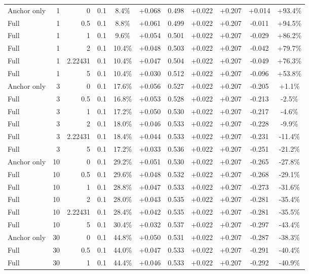 \begin{table}[htbp]
\begin{tabular}{lrrrccccccc}
Anchor only & 1 & 0 & 0.1 & 8.4\% & +0.068 & 0.498 & +0.022 & +0.207 & +0.014 & +93.4\% \\
Full & 1 & 0.5 & 0.1 & 8.8\% & +0.061 & 0.499 & +0.022 & +0.207 & -0.011 & +94.5\% \\
Full & 1 & 1 & 0.1 & 9.6\% & +0.054 & 0.501 & +0.022 & +0.207 & -0.029 & +86.2\% \\
Full & 1 & 2 & 0.1 & 10.4\% & +0.048 & 0.503 & +0.022 & +0.207 & -0.042 & +79.7\% \\
Full & 1 & 2.22431 & 0.1 & 10.4\% & +0.047 & 0.504 & +0.022 & +0.207 & -0.049 & +76.3\% \\
Full & 1 & 5 & 0.1 & 10.4\% & +0.030 & 0.512 & +0.022 & +0.207 & -0.096 & +53.8\% \\
Anchor only & 3 & 0 & 0.1 & 17.6\% & +0.056 & 0.527 & +0.022 & +0.207 & -0.205 & +1.1\% \\
Full & 3 & 0.5 & 0.1 & 16.8\% & +0.053 & 0.528 & +0.022 & +0.207 & -0.213 & -2.5\% \\
Full & 3 & 1 & 0.1 & 17.2\% & +0.050 & 0.530 & +0.022 & +0.207 & -0.217 & -4.6\% \\
Full & 3 & 2 & 0.1 & 18.0\% & +0.046 & 0.533 & +0.022 & +0.207 & -0.228 & -9.9\% \\
Full & 3 & 2.22431 & 0.1 & 18.4\% & +0.044 & 0.533 & +0.022 & +0.207 & -0.231 & -11.4\% \\
Full & 3 & 5 & 0.1 & 17.2\% & +0.033 & 0.536 & +0.022 & +0.207 & -0.251 & -21.2\% \\
Anchor only & 10 & 0 & 0.1 & 29.2\% & +0.051 & 0.530 & +0.022 & +0.207 & -0.265 & -27.8\% \\
Full & 10 & 0.5 & 0.1 & 29.6\% & +0.048 & 0.532 & +0.022 & +0.207 & -0.268 & -29.1\% \\
Full & 10 & 1 & 0.1 & 28.8\% & +0.047 & 0.533 & +0.022 & +0.207 & -0.273 & -31.6\% \\
Full & 10 & 2 & 0.1 & 28.0\% & +0.043 & 0.535 & +0.022 & +0.207 & -0.281 & -35.4\% \\
Full & 10 & 2.22431 & 0.1 & 28.4\% & +0.042 & 0.535 & +0.022 & +0.207 & -0.281 & -35.5\% \\
Full & 10 & 5 & 0.1 & 30.4\% & +0.032 & 0.537 & +0.022 & +0.207 & -0.297 & -43.4\% \\
Anchor only & 30 & 0 & 0.1 & 44.8\% & +0.050 & 0.531 & +0.022 & +0.207 & -0.287 & -38.3\% \\
Full & 30 & 0.5 & 0.1 & 44.0\% & +0.047 & 0.533 & +0.022 & +0.207 & -0.291 & -40.4\% \\
Full & 30 & 1 & 0.1 & 44.4\% & +0.046 & 0.533 & +0.022 & +0.207 & -0.292 & -40.9\% \\

\end{tabular}
\end{table}
